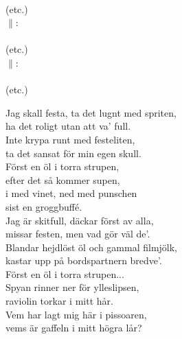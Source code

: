 \documentclass[a6paper, 10pt, twoside]{article}
\begin{document}
\begin{lyrics}
\vspace{5pt} \\
\textit{} (etc.) 
\vspace{5pt} \\
$\|$: \\
\noindent
\physicalonly{\vspace{5pt}} \\
\textit{} (etc.) 
\vspace{5pt} \\
$\|$:  \\
\vspace{5pt} \\
\textit{} (etc.) 
\end{lyrics}

\begin{center}
\end{center}
\vspace{-3pt}
\begin{lyrics}
Jag skall festa, ta det lugnt med spriten,\\
ha det roligt utan att va' full.\\
Inte krypa runt med festeliten,\\
ta det sansat för min egen skull.
\vspace{5pt} \\
Först en öl i torra strupen,\\
efter det så kommer supen,\\
i med vinet, ned med punschen\\
sist en groggbuffé.
\vspace{5pt} \\
Jag är skitfull, däckar först av alla,\\
missar festen, men vad gör väl de'.\\
Blandar hejdlöst öl och gammal filmjölk,\\
kastar upp på bordspartnern bredve'.
\vspace{5pt} \\
Först en öl i torra strupen...
\vspace{5pt} \\
Spyan rinner ner för ylleslipsen,\\
raviolin torkar i mitt hår.\\
Vem har lagt mig här i pissoaren,\\
vems är gaffeln i mitt högra lår?
\end{lyrics}
\end{document}
